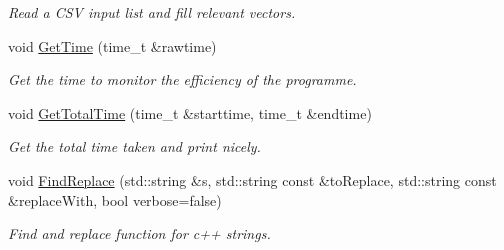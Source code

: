 \begin{DoxyCompactItemize}
\begin{DoxyCompactList}\small\item\em Read a C\-S\-V input list and fill relevant vectors. \end{DoxyCompactList}\item 
void \hyperlink{namespacecalib_a561fb5ee74ec984c53d40ad60837c28f}{Get\-Time} (time\-\_\-t \&rawtime)
\begin{DoxyCompactList}\small\item\em Get the time to monitor the efficiency of the programme. \end{DoxyCompactList}\item 
void \hyperlink{namespacecalib_a676d08e0e092c9a8dfdc9cdbd9709fec}{Get\-Total\-Time} (time\-\_\-t \&starttime, time\-\_\-t \&endtime)
\begin{DoxyCompactList}\small\item\em Get the total time taken and print nicely. \end{DoxyCompactList}\item 
void \hyperlink{namespacecalib_acbaccbe06abdfec3dd3f72fee4e5da5c}{Find\-Replace} (std\-::string \&s, std\-::string const \&to\-Replace, std\-::string const \&replace\-With, bool verbose=false)
\begin{DoxyCompactList}\small\item\em Find and replace function for c++ strings. \end{DoxyCompactList}\end{DoxyCompactItemize}
